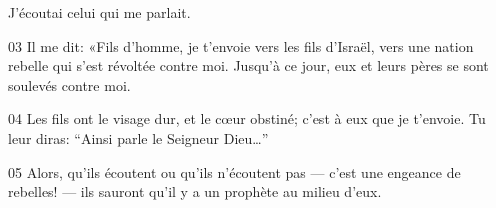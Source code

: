 J’écoutai celui qui me parlait.

03 Il me dit: «Fils d’homme, je t’envoie vers les fils d’Israël, vers une nation rebelle qui s’est révoltée contre moi. Jusqu’à ce jour, eux et leurs pères se sont soulevés contre moi.

04 Les fils ont le visage dur, et le cœur obstiné; c’est à eux que je t’envoie. Tu leur diras: “Ainsi parle le Seigneur Dieu…”

05 Alors, qu’ils écoutent ou qu’ils n’écoutent pas --- c’est une engeance de rebelles! --- ils sauront qu’il y a un prophète au milieu d’eux.
